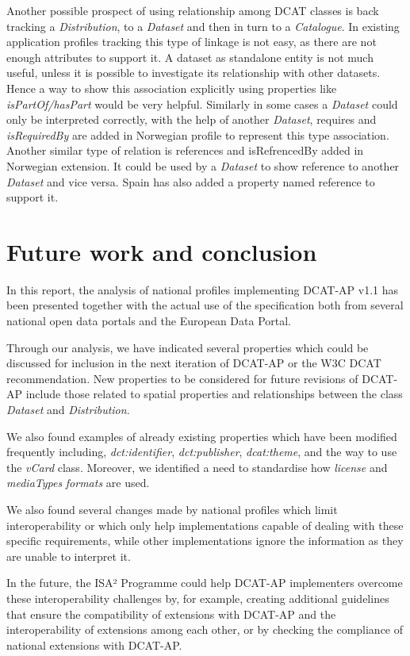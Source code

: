 \documentclass[<options>]{elsarticle}
\begin{document}
Another possible prospect of using relationship among DCAT classes is back tracking a \textit{Distribution}, to a \textit{Dataset} and then in turn to a \textit{Catalogue}. In existing application profiles tracking this type of linkage is not easy, as there are not enough attributes to support it. A dataset as standalone entity is not much useful, unless it is possible to investigate its relationship with other datasets. Hence a way to show this association explicitly using properties like \textit{isPartOf/hasPart }would be very helpful. Similarly in some cases a \textit{Dataset} could only be interpreted correctly, with the help of another \textit{Dataset}, requires and \textit{isRequiredBy} are added in Norwegian profile to represent this type association. Another similar type of relation is references and isRefrencedBy added in Norwegian extension. It could be used by a \textit{Dataset} to show reference to another \textit{Dataset} and vice versa. Spain has also added a property named reference to support it.

\section{Future work and conclusion}
In this report, the analysis of national profiles implementing DCAT-AP v1.1 has been presented together with the actual use of the specification both from several national open data portals and the European Data Portal. 

Through our analysis, we have indicated several properties which could be discussed for inclusion in the next iteration of DCAT-AP or the W3C DCAT recommendation. New properties to be considered for future revisions of DCAT-AP include those related to spatial properties and relationships between the class \textit{Dataset} and \textit{Distribution}.

We also found examples of already existing properties which have been modified frequently including, \textit{dct:identifier}, \textit{dct:publisher}, \textit{dcat:theme}, and the way to use the \textit{vCard }class. Moreover, we identified a need to standardise how \textit{license} and \textit{mediaTypes} \textit{formats }are used. 

We also found several changes made by national profiles which limit interoperability or which only help implementations capable of dealing with these specific requirements, while other implementations ignore the information as they are unable to interpret it. 

In the future, the ISA² Programme could help DCAT-AP implementers overcome these interoperability challenges by, for example, creating additional guidelines that ensure the compatibility of extensions with DCAT-AP and the interoperability of extensions among each other, or by checking the compliance of national extensions with DCAT-AP.
\end{document}
